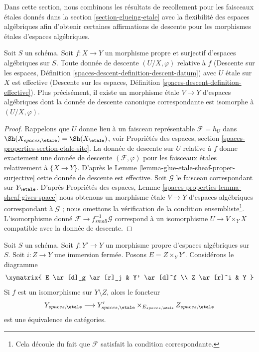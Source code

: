\noindent
Dans cette section, nous combinons les résultats de recollement pour les faisceaux \'etales donnés dans la section \ref{section-glueing-etale} avec la flexibilité des espaces algébriques afin d'obtenir certaines affirmations de descente pour les morphismes \'etales d'espaces algébriques.

\begin{lemma}
\label{lemma-descend-etale-proper-surjective}
Soit $S$ un schéma. Soit $f : X \to Y$ un morphisme propre et surjectif
d'espaces algébriques sur $S$. Toute donnée de descente $(U/X, \varphi)$ relative à $f$
(Descente sur les espaces, Définition \ref{spaces-descent-definition-descent-datum})
avec $U$ \'etale sur $X$ est effective
(Descente sur les espaces, Définition \ref{spaces-descent-definition-effective}).
Plus précisément, il existe un morphisme \'etale $V \to Y$ d'espaces algébriques
dont la donnée de descente canonique correspondante est isomorphe à $(U/X, \varphi)$.
\end{lemma}

\begin{proof}
Rappelons que $U$ donne lieu à un faisceau représentable
$\mathcal{F} = h_U$ dans $\Sh(X_{spaces, \etale}) = \Sh(X_\etale)$, voir
Propriétés des espaces, section \ref{spaces-properties-section-etale-site}.
La donnée de descente sur $U$ relative à $f$
donne exactement une donnée de descente $(\mathcal{F}, \varphi)$
pour les faisceaux \'etales relativement à $\{X \to Y\}$.
D'après le Lemme \ref{lemma-glue-etale-sheaf-proper-surjective}
cette donnée de descente est effective.
Soit $\mathcal{G}$ le faisceau correspondant sur $Y_\etale$.
D'après Propriétés des espaces, Lemme \ref{spaces-properties-lemma-sheaf-gives-space}
nous obtenons un morphisme \'etale $V \to Y$ d'espaces algébriques
correspondant à $\mathcal{G}$ ; nous omettons la vérification de
la condition ensembliste\footnote{Cela découle du fait que $\mathcal{F}$ satisfait la condition correspondante.}.
L'isomorphisme donné $\mathcal{F} \to f_{small}^{-1}\mathcal{G}$
correspond à un isomorphisme $U \to V \times_Y X$ compatible avec la donnée de descente.
\end{proof}

\begin{lemma}
\label{lemma-glue-etale-space-modification}
Soit $S$ un schéma. Soit $f : Y' \to Y$ un morphisme propre d'espaces algébriques sur $S$. Soit $i : Z \to Y$ une immersion fermée. Posons $E = Z \times_Y Y'$. Considérons le diagramme
$$
\xymatrix{
E \ar[d]_g \ar[r]_j & Y' \ar[d]^f \\
Z \ar[r]^i & Y
}
$$
Si $f$ est un isomorphisme sur $Y \setminus Z$, alors le foncteur $$
Y_{spaces, \etale}
\longrightarrow
Y'_{spaces, \etale} \times_{E_{spaces, \etale}} Z_{spaces, \etale}
$$ est une équivalence de catégories.
\end{lemma}

